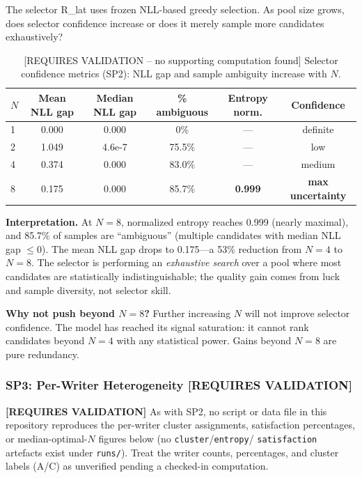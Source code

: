 \documentclass[10.5pt,a4paper]{article}
\newcommand{\fp}[1]{\nolinkurl{#1}}
\newcommand{\src}[1]{\par\vspace{1pt}{\footnotesize\textcolor{gray}{Source:} #1\par}}
\begin{document}
The selector R\_lat uses frozen NLL-based greedy selection. As pool size grows, does selector confidence increase or does it
merely sample more candidates exhaustively?

\begin{table}[H]
\centering
\caption{[REQUIRES VALIDATION -- no supporting computation found] Selector confidence metrics (SP2): NLL gap and sample ambiguity increase with $N$.}
\label{tab:f8_selector}
\small
\begin{tabular}{lccccc}
\toprule
$N$ & Mean NLL gap & Median NLL gap & \% ambiguous & Entropy norm. & Confidence \\
\midrule
1 & 0.000 & 0.000 & 0\% & --- & definite \\
2 & 1.049 & 4.6e-7 & 75.5\% & --- & low \\
4 & 0.374 & 0.000 & 83.0\% & --- & medium \\
8 & 0.175 & 0.000 & 85.7\% & \textbf{0.999} & \textbf{max uncertainty} \\
\bottomrule
\end{tabular}
\src{SP2 NLL and entropy analysis}
\end{table}

\textbf{Interpretation.} At $N{=}8$, normalized entropy reaches 0.999 (nearly maximal), and 85.7\% of samples are ``ambiguous''
(multiple candidates with median NLL gap $\le 0$). The mean NLL gap drops to 0.175---a 53\% reduction from $N{=}4$ to $N{=}8$.
The selector is performing an \emph{exhaustive search} over a pool where most candidates are statistically indistinguishable;
the quality gain comes from luck and sample diversity, not selector skill.

\textbf{Why not push beyond $N{=}8$?} Further increasing $N$ will not improve selector confidence. The model has reached its
signal saturation: it cannot rank candidates beyond $N{=}4$ with any statistical power. Gains beyond $N{=}8$ are pure redundancy.

\subsubsection{SP3: Per-Writer Heterogeneity [\textbf{REQUIRES VALIDATION}]}

\textbf{[REQUIRES VALIDATION]} As with SP2, no script or data file in this repository reproduces the per-writer
cluster assignments, satisfaction percentages, or median-optimal-$N$ figures below (no \texttt{cluster}/\texttt{entropy}/
\texttt{satisfaction} artefacts exist under \fp{runs/}). Treat the writer counts, percentages, and cluster labels (A/C) as
unverified pending a checked-in computation.
\end{document}
